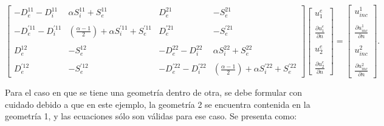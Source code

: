 \documentclass[12pt,letterpaper]{article}
\numberwithin{equation}{section}
\begin{document}
\begin{equation} 
\begin{bmatrix}
-D_{e}^{11} - D_{i}^{11} & \alpha S_{i}^{11} + S_{e}^{11} & D_{e}^{21} & -S_{e}^{21} \\
\\
-D_{e}^{'11} - D_{i}^{'11} & (\frac{\alpha - 1}{2})+\alpha S_{i}^{'11} + S_{e}^{'11} & D_{e}^{'21} & -S_{e}^{'21}\\
\\
D_{e}^{12} & -S_{e}^{12} & -D_{e}^{22} - D_{i}^{22} & \alpha S_{i}^{22} + S_{e}^{22}\\
\\
D_{e}^{'12} & -S_{e}^{'12} & -D_{e}^{'22} - D_{i}^{'22} & (\frac{\alpha - 1}{2})+\alpha S_{i}^{'22} + S_{e}^{'22}
\end{bmatrix}
\begin{bmatrix}
u^{e}_1\\
\\
\frac{\partial u^{e}_1}{\partial n}\\
\\
u^{e}_2\\
\\
\frac{\partial u^{e}_2}{\partial n}
\end{bmatrix}
=
\begin{bmatrix}
u_{inc}^1\\
\\
\frac{\partial u_{inc}^1}{\partial n}\\
\\
u_{inc}^2\\
\\
\frac{\partial u_{inc}^2}{\partial n}
\end{bmatrix}.
\label{eq:multi2_matriz ext}		 
\end{equation} 

Para el caso en que se tiene una geometría dentro de otra, se debe formular con cuidado debido a que en este ejemplo, la geometría 2 se encuentra contenida en la geometría 1, y las ecuaciones sólo son válidas para ese caso. Se presenta como:
\end{document}
